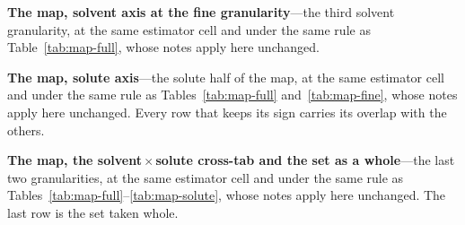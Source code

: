 \begin{table}[tp]
\centering
\caption[The map, solvent axis at the fine granularity]{\textbf{The map, solvent axis at the fine granularity}---the third solvent granularity, at
the same estimator cell and under the same rule as Table~\ref{tab:map-full}, whose notes apply
here unchanged.}
\label{tab:map-fine}
{\scriptsize
\setlength{\tabcolsep}{2pt}
\renewcommand{\arraystretch}{0.7}
}
\end{table}

\begin{table}[tp]
\centering
\caption[The map, solute axis]{\textbf{The map, solute axis}---the solute half of the map, at the same
estimator cell and under the same rule as Tables~\ref{tab:map-full} and~\ref{tab:map-fine}, whose
notes apply here unchanged. Every row that keeps its sign carries its overlap with the others.}
\label{tab:map-solute}
{\scriptsize
\setlength{\tabcolsep}{2pt}
\renewcommand{\arraystretch}{0.7}
}
\end{table}

\begin{table}[tp]
\centering
\caption[The map, the solvent-by-solute cross-tab and the set as a whole]{\textbf{The map, the solvent\,$\times$\,solute cross-tab and the set as a whole}---the
last two granularities, at the same estimator cell and under the same
rule as Tables~\ref{tab:map-full}--\ref{tab:map-solute}, whose notes apply here unchanged. The last
row is the set taken whole.}
\label{tab:map-xtab}
{\scriptsize
\setlength{\tabcolsep}{2pt}
\renewcommand{\arraystretch}{0.7}
}
\end{table}

